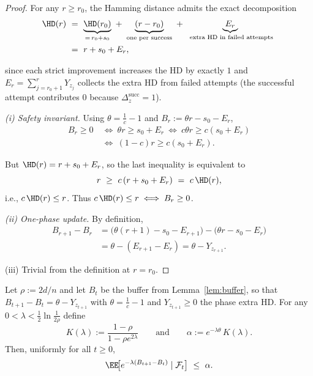 \begin{proof}
	For any $r\ge r_0$, the Hamming distance admits the exact decomposition
	\begin{align*}
		\HD(r)\ &=\ \underbrace{\HD(r_0)}_{=\,r_0+s_0}\ +\ \underbrace{(r-r_0)}_{\text{one per success}}\ +\ \underbrace{E_r}_{\text{ extra HD in failed attempts}}
		\ \\&=\ r+s_0+E_r,		
	\end{align*}
	
	since each strict improvement increases the HD by exactly $1$ and $E_r=\sum_{j=r_0+1}^r Y_{z_j}$ collects the extra HD from failed attempts (the successful attempt contributes $0$ because $\Delta_z^{\mathrm{succ}}=1$).
	
	\smallskip
	\emph{(i) Safety invariant.}
	Using $\theta=\tfrac{1}{c}-1$ and $B_r:=\theta r - s_0 - E_r$,
	\begin{align*}
		B_r\ge 0
		\ &\Longleftrightarrow\
		\theta r \ge s_0+E_r
		\ \Longleftrightarrow\
		c\theta r \ge c(s_0+E_r)
		\\ &\Longleftrightarrow\
		(1-c)r \ge c(s_0+E_r).	
	\end{align*}
	
	
	But $\HD(r)=r+s_0+E_r$, so the last inequality is equivalent to
	\[
	r \ \ge\ c\,(r+s_0+E_r)\ =\ c\,\HD(r),
	\]
	i.e., $c\,\HD(r)\le r$. Thus $c\,\HD(r)\le r \iff B_r\ge 0$.
	
	\smallskip
	\emph{(ii) One-phase update.}
	By definition,
	\begin{align*}
		B_{r+1}-B_r
		&= \bigl(\theta(r+1)-s_0-E_{r+1}\bigr) - \bigl(\theta r - s_0 - E_r\bigr)
		\\&= \theta - (E_{r+1}-E_r)
		= \theta - Y_{z_{r+1}}.
	\end{align*}
	
	
	
	\smallskip
	(iii) Trivial from the definition at $r=r_0$.
\end{proof}

\begin{lemma}\label{lem:drift-envelope-global}
	Let $\rho:=2d/n$ and let $B_t$ be the buffer from Lemma~\ref{lem:buffer}, so that
	$B_{t+1}-B_t=\theta-Y_{z_{t+1}}$ with $\theta=\tfrac{1}{c}-1$ and $Y_{z_{t+1}}\ge 0$ the phase extra HD.
	For any $0<\lambda<\tfrac12\ln\!\tfrac{1}{2\rho}$ define
	\[
	K(\lambda):=\frac{1-\rho}{1-\rho e^{2\lambda}}
	\qquad\text{and}\qquad
	\alpha:=e^{-\lambda\theta}\,K(\lambda).
	\]
	Then, uniformly for all $t\ge 0$,
	\[
	\EE\!\big[e^{-\lambda(B_{t+1}-B_t)}\mid \mathcal F_t\big]\ \le\ \alpha.
	\]
\end{lemma}

